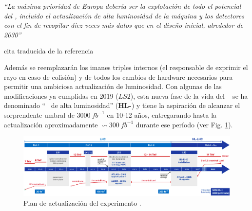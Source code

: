 \begin{minipage}{0.9\linewidth}
\vspace{5pt}%
{\small }
\textit{``La máxima prioridad de Europa debería ser la explotación de todo el potencial del \LHC, incluido el actualización de alta luminosidad de la máquina y los detectores con el fin de recopilar diez veces más datos que en el diseño inicial, alrededor de 2030''}
\begin{flushright}
cita traducida de la referencia \cite{wells_upgraded_2015}
\end{flushright}
\vspace{5pt}%
\end{minipage}

Además se reemplazarán los imanes triples internos (el responsable de exprimir el rayo en caso de colisión) y de todos los cambios de hardware necesarios para permitir una ambiciosa actualización de luminosidad. Con algunas de las modificaciones ya cumplidas en 2019 ($LS2$), esta nueva fase de la vida del \LHC ~ se ha denominado ``\LHC ~ de alta luminosidad'' (\textbf{HL-}\LHC) y tiene la aspiración de alcanzar el sorprendente umbral de $3000~fb^{-1}$ en 10-12 años, entregarando hasta la actualización aproximadamente $\backsim 300~fb^{-1}$ durante ese período (ver Fig. \ref{cms_actualiza}).


\begin{figure}[h!]
\centering
\includegraphics[width=1\textwidth]{Analisis_y_Resultados/imagenes/CMS_upgrade.png}
\caption[Plan de actualización del experimento \LHC.]{Plan de actualización del experimento \LHC.\footnotemark}
\label{cms_actualiza}
\end{figure}


